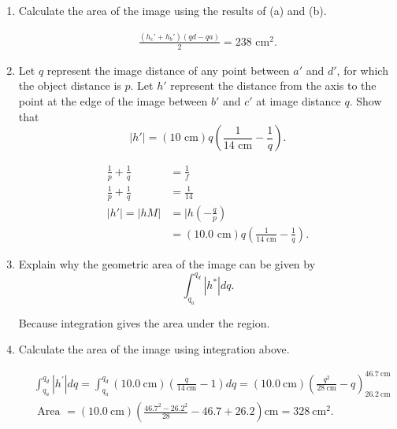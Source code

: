 \documentclass{zc-ust-hw}
\begin{document}
\begin{enumerate}
\begin{enumerate}
      \item Calculate the area of the image using the results of (a) and (b).
        \begin{sol}
          \begin{align}
            \frac{(h_c'+h_b')(qd-qa)}{2}= 238\text{ cm}^2
          .\end{align}
        \end{sol}
      \item Let $q$ represent the image distance of any point between $a'$ and $d'$,
        for which the object distance is $p$. Let $h'$ represent the distance from
        the axis to the point at the edge of the image between $b'$ and $c'$ at
        image distance $q$. Show that 
        \[
          |h'|=(10\text{ cm})q\left(\frac{1}{14\text{ cm}}-\frac{1}{q}\right) 
        .\] 
        \begin{sol}
          \begin{align}
            \frac{1}{p}+\frac{1}{q}&=\frac{1}{f} \\
            \frac{1}{p}+\frac{1}{q}&=\frac{1}{14} \\
            |h'| = |hM| &= |h \left( -\frac{q}{p} \right) \\
                        &= (10.0\text{ cm})q \left( \frac{1}{14\text{ cm}}-\frac{1}{q} \right) 
          .\end{align}
        \end{sol}
      \item Explain why the geometric area of the image can be given by
        \[
          \int_{q_a}^{q_d} |h^*|dq 
        .\] 
        \begin{sol}
          Because integration gives the area under the region.
        \end{sol}
      \item Calculate the area of the image using integration above.
        \begin{sol}
          \begin{align}
& \int_{q_a}^{q_d}\left|h^{\prime}\right| d q=\int_{q_a}^{q_d}(10.0
            \mathrm{~cm})\left(\frac{q}{14 \mathrm{~cm}}-1\right) d q=(10.0
            \mathrm{~cm})\left(\frac{q^2}{28 \mathrm{~cm}}-q\right)_{26.2
          \mathrm{~cm}}^{46.7 \mathrm{~cm}} \\ & \text { Area }=(10.0
          \mathrm{~cm})\left(\frac{46.7^2-26.2^2}{28}-46.7+26.2\right)
          \mathrm{cm}=328 \mathrm{~cm}^2
          .\end{align}
        \end{sol}
    \end{enumerate}
    

\end{enumerate}
\end{document}
